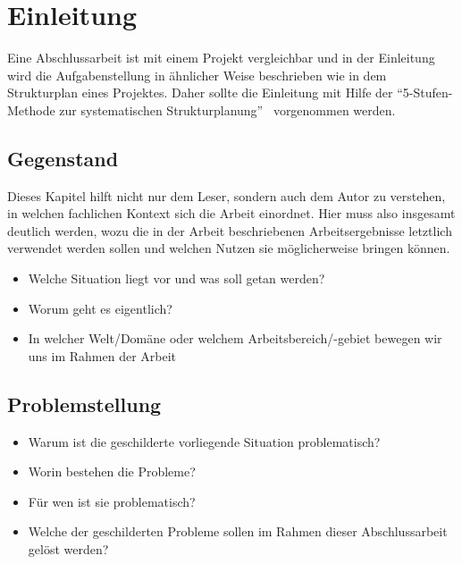 \chapter{Einleitung}\label{ch:introduction}
\begin{temp}
Eine Abschlussarbeit ist mit einem Projekt vergleichbar und in der Einleitung wird die Aufgabenstellung in ähnlicher Weise beschrieben wie in dem Strukturplan eines Projektes.
Daher sollte die Einleitung mit Hilfe der \enquote{5-Stufen-Methode zur systematischen Strukturplanung}~\citep{ob}\footnotemark{} vorgenommen werden.

\section{Gegenstand}
Dieses Kapitel hilft nicht nur dem Leser, sondern auch dem Autor zu verstehen, in welchen fachlichen Kontext sich die Arbeit einordnet.
Hier muss also insgesamt deutlich werden, wozu die in der Arbeit beschriebenen Arbeitsergebnisse letztlich verwendet werden sollen und welchen Nutzen sie möglicherweise bringen können.

\begin{itemize}
\item Welche Situation liegt vor und was soll getan werden?
\item Worum geht es eigentlich?
\item In welcher Welt/Domäne oder welchem Arbeitsbereich/-gebiet bewegen wir uns im Rahmen der Arbeit
\end{itemize}

\section{Problemstellung}
\begin{itemize}
\item Warum ist die geschilderte vorliegende Situation problematisch?
\item Worin bestehen die Probleme?
\item Für wen ist sie problematisch?
\item Welche der geschilderten Probleme sollen im Rahmen dieser Abschlussarbeit gelöst werden?
\end{itemize}


\end{temp}
